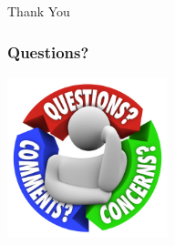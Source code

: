 \documentclass[10pt]{beamer}
\begin{document}
\begin{frame}
  \begin{center}
    \Huge{Thank You}
  \end{center}
\end{frame}

\begin{frame}
	\frametitle{Questions?}
	\begin{center}
	\includegraphics[width=0.35\textwidth]{q5.jpg}
	\end{center}
\end{frame}

\end{document}
